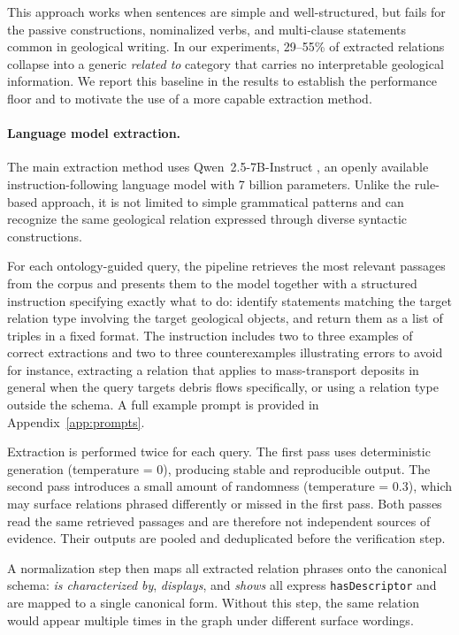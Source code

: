 \documentclass[10pt]{article}
\newcommand{\pred}[1]{\texttt{\small #1}}
\begin{document}
This approach works when sentences are simple and
well-structured, but fails for the passive constructions,
nominalized verbs, and multi-clause statements common in
geological writing.
In our experiments, 29--55\% of extracted relations collapse
into a generic \emph{related to} category that carries no
interpretable geological information.
We report this baseline in the results to establish the
performance floor and to motivate the use of a more capable
extraction method.

\paragraph{Language model extraction.}
The main extraction method uses Qwen~2.5-7B-Instruct
\citep{yang2024qwen2technicalreport}, an openly available
instruction-following language model with 7 billion
parameters.
Unlike the rule-based approach, it is not limited to simple
grammatical patterns and can recognize the same geological
relation expressed through diverse syntactic constructions.

For each ontology-guided query, the pipeline retrieves
the most relevant passages from the corpus and presents them
to the model together with a structured instruction specifying
exactly what to do: identify statements matching the target
relation type involving the target geological objects, and
return them as a list of triples in a fixed format.
The instruction includes two to three examples of correct
extractions and two to three counterexamples illustrating
errors to avoid  for instance, extracting a relation that
applies to mass-transport deposits in general when the query
targets debris flows specifically, or using a relation type
outside the schema.
A full example prompt is provided in
Appendix~\ref{app:prompts}.

Extraction is performed twice for each query.
The first pass uses deterministic generation (temperature = 0),
producing stable and reproducible output.
The second pass introduces a small amount of randomness
(temperature = 0.3), which may surface relations phrased
differently or missed in the first pass.
Both passes read the same retrieved passages and are therefore
not independent sources of evidence.
Their outputs are pooled and deduplicated before the
verification step.

A normalization step then maps all extracted relation phrases
onto the canonical schema: \emph{is characterized by},
\emph{displays}, and \emph{shows} all express
\pred{hasDescriptor} and are mapped to a single canonical
form.
Without this step, the same relation would appear multiple
times in the graph under different surface wordings.
\end{document}
